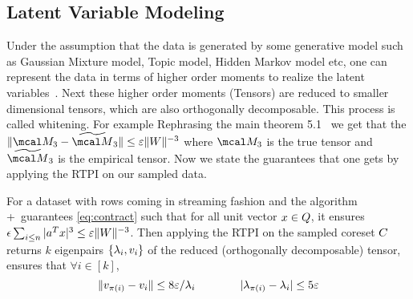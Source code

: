 \subsection{Latent Variable Modeling}{\label{sec:application}}
Under the assumption that the data is generated by some generative model such as Gaussian Mixture model, Topic model, Hidden Markov model etc, one can represent the data in terms of higher order moments to realize the latent variables~\cite{anandkumar2014tensor}. Next these higher order moments (Tensors) are reduced to smaller dimensional tensors, which are also orthogonally decomposable. This process is called whitening. For example 
Rephrasing the main theorem 5.1~\cite{anandkumar2014tensor} we get that the $\|\mcal M_{3} - \widetilde{\mcal M}_{3}\| \leq \varepsilon\|\*W\|^{-3}$ where $\mcal M_{3}$ is the true tensor and $\widetilde{\mcal M}_{3}$ is the empirical tensor.
Now we state the guarantees that one gets by applying the RTPI on our sampled data.
\begin{corollary}{\label{coro:tensorFactors}}
 For a dataset with rows coming in streaming fashion and the algorithm \online+~guarantees \eqref{eq:contract} such that for all unit vector $\*x \in \*Q$, it ensures $\epsilon\sum_{i \leq n} |\*a^{T}\*x|^{3} \leq \varepsilon \|\*W\|^{-3}$. Then applying the RTPI on the sampled coreset $\*C$ returns $k$ eigenpairs $\{\lambda_{i},\*v_{i}\}$ of the reduced (orthogonally decomposable) tensor, ensures that $\forall i \in [k]$,
 $$\|\*v_{\pi(i)} - \*v_{i}\| \leq 8\varepsilon/\lambda_{i} \qquad \qquad |\lambda_{\pi(i)}-\lambda_{i}| \leq 5\varepsilon$$
\end{corollary}



